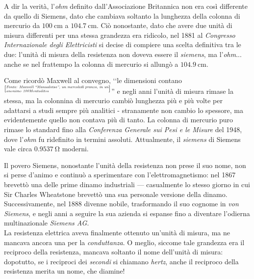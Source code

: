 \begin{digressionwt}
	A dir la verità, l'\textit{ohm} definito dall'Associazione Britannica non era così differente da quello di Siemens, dato che cambiava soltanto la lunghezza della colonna di mercurio da $\SI{100}{\centi\meter}$ a $\SI{104.7}{\centi\meter}$. Ciò nonostante, dato che avere due unità di misura differenti per una stessa grandezza era ridicolo, nel 1881 al \textit{Congresso Internazionale degli Elettricisti} si decise di compiere una scelta definitiva tra le due: l'unità di misura della resistenza non doveva essere il \textit{siemens}, ma l'\textit{ohm}... anche se nel frattempo la colonna di mercurio si allungò a $\SI{104.9}{\centi\meter}$.\newline %
	
	\noindent Come ricordò Maxwell al convegno, ‘‘le dimensioni contano\textsuperscript{{$\left[\parbox{15em}{\tiny\textit{Fonte: Maxwell ‘‘Manualotso'', un mercoledì pranzo, in un anonimo 100Montaditos}}\right]$}}'' e negli anni l'unità di misura rimase la stessa, ma la colonnina di mercurio cambiò lunghezza più e più volte per adattarsi a studi sempre più analitici - stranamente non cambio lo spessore, ma evidentemente quello non contava più di tanto. La colonna di mercurio puro rimase lo standard fino alla \textit{Conferenza Generale sui Pesi e le Misure} del 1948, dove l'\textit{ohm} fu ridefinito in termini assoluti. Attualmente, il \textit{siemens} di Siemens vale circa $\SI{0.9537}{\ohm}$ moderni.
	
	Il povero Siemens, nonostante l'unità della resistenza non prese il suo nome, non si perse d'animo e continuò a sperimentare con l'elettromagnetismo: nel 1867 brevettò una delle prime dinamo industriali --- casualmente lo stesso giorno in cui Sir Charles Wheatstone brevettò una sua personale versione della dinamo. Successivamente, nel 1888 divenne nobile, trasformando il suo cognome in \textit{von Siemens}, e negli anni a seguire la sua azienda si espanse fino a diventare l'odierna multinazionale \textit{Siemens AG}.\newline~\\
	La resistenza elettrica aveva finalmente ottenuto un'unità di misura, ma ne mancava ancora una per la \textit{conduttanza}. O meglio, siccome tale grandezza era il reciproco della resistenza, mancava soltanto il nome dell'unità di misura: dopotutto, se i reciproci dei \textit{secondi} si chiamano \textit{hertz}, anche il reciproco della resistenza merita un nome, che diamine!
	

\end{digressionwt}
